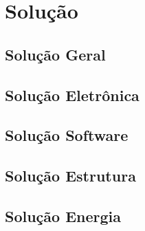 \chapter[Solução]{Solução}
	\section[Solução Geral]{Solução Geral}

	\section[Solução Eletrônica]{Solução Eletrônica}

	\section[Solução Software]{Solução Software}

	\section[Solução Estrutura]{Solução Estrutura}

	\section[Solução Energia]{Solução Energia}
